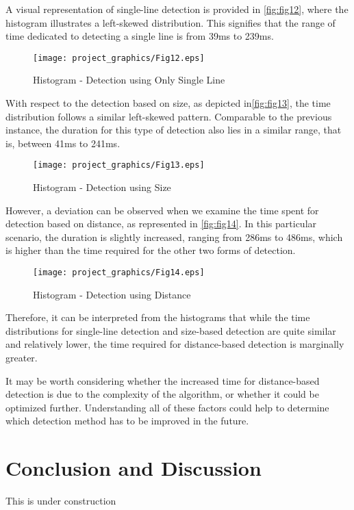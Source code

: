 \documentclass[]{iat}
\begin{document}
\par
 A visual representation of single-line detection is provided in \autoref{fig:fig12}, where the histogram illustrates a left-skewed distribution. This signifies that the range of time dedicated to detecting a single line is from 39ms to 239ms.
\par
\FloatBarrier
\begin{figure}[h]
	\texttt{[image: project\_graphics/Fig12.eps]}
	\caption{Histogram - Detection using Only Single Line  }
	\label{fig:fig12}
\end{figure}
\par
With respect to the detection based on size, as depicted in\autoref{fig:fig13}, the time distribution follows a similar left-skewed pattern. Comparable to the previous instance, the duration for this type of detection also lies in a similar range, that is, between 41ms to 241ms.
\par
\FloatBarrier
\begin{figure}[h]
	\texttt{[image: project\_graphics/Fig13.eps]}
	\caption{Histogram - Detection using Size  }
	\label{fig:fig13}
\end{figure}
\par
However, a deviation can be observed when we examine the time spent for detection based on distance, as represented in \autoref{fig:fig14}. In this particular scenario, the duration is slightly increased, ranging from 286ms to 486ms, which is higher than the time required for the other two forms of detection.
\par
\FloatBarrier
\begin{figure}[h]
	\texttt{[image: project\_graphics/Fig14.eps]}
	\caption{Histogram - Detection using Distance  }
	\label{fig:fig14}
\end{figure}
\par
Therefore, it can be interpreted from the histograms that while the time distributions for single-line detection and size-based detection are quite similar and relatively lower, the time required for distance-based detection is marginally greater.
\par
It may be worth considering whether the increased time for distance-based detection is due to the complexity of the algorithm, or whether it could be optimized further. Understanding all of these factors could help to determine which detection method has to be improved in the future. 
\par
\chapter{Conclusion and Discussion}
This is under construction

\printbibliography
\end{document}
